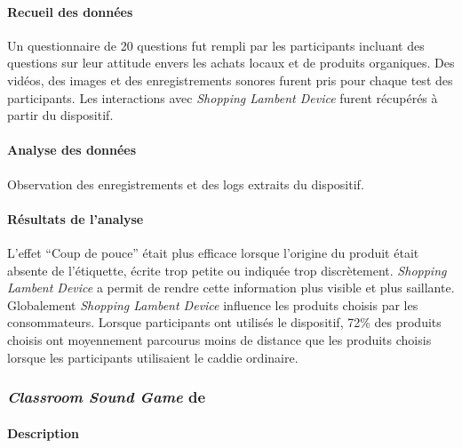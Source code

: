 \documentclass[10pt,a5paper,twoside]{article}
\begin{document}
\paragraph{Recueil des données}\label{recueil-des-donnuxe9es-3}

Un questionnaire de 20 questions fut rempli par les participants
incluant des questions sur leur attitude envers les achats locaux et de
produits organiques. Des vidéos, des images et des enregistrements
sonores furent pris pour chaque test des participants. Les interactions
avec \emph{Shopping Lambent Device} furent récupérés à partir du
dispositif.

\paragraph{Analyse des données}\label{analyse-des-donnuxe9es-2}

Observation des enregistrements et des logs extraits du dispositif.

\paragraph{Résultats de l'analyse}\label{ruxe9sultats-de-lanalyse-2}

L'effet ``Coup de pouce'' était plus efficace lorsque l'origine du
produit était absente de l'étiquette, écrite trop petite ou indiquée
trop discrètement. \emph{Shopping Lambent Device} a permit de rendre
cette information plus visible et plus saillante. Globalement
\emph{Shopping Lambent Device} influence les produits choisis par les
consommateurs. Lorsque participants ont utilisés le dispositif, 72\% des
produits choisis ont moyennement parcourus moins de distance que les
produits choisis lorsque les participants utilisaient le caddie
ordinaire.

\subsubsection{\emph{Classroom Sound Game} de
\citet{reis2011perception}}\label{classroom-sound-game-de-reis2011perception}

\paragraph{Description}\label{description-5}
\end{document}
